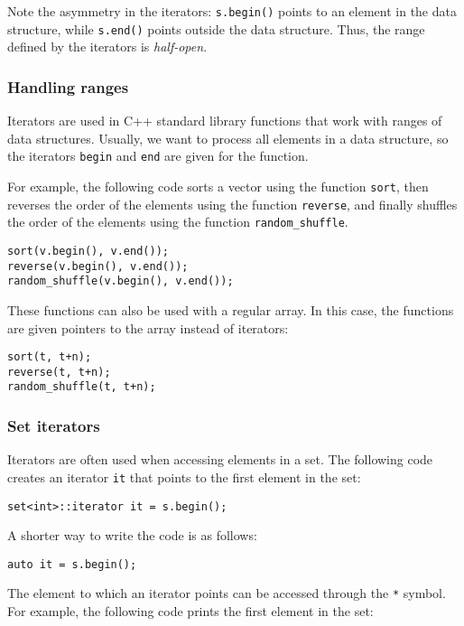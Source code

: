 Note the asymmetry in the iterators:
\texttt{s.begin()} points to an element in the data structure,
while \texttt{s.end()} points outside the data structure.
Thus, the range defined by the iterators is \emph{half-open}.

\subsubsection{Handling ranges}

Iterators are used in C++ standard library functions
that work with ranges of data structures.
Usually, we want to process all elements in a
data structure, so the iterators
\texttt{begin} and \texttt{end} are given for the function.

For example, the following code sorts a vector
using the function \texttt{sort},
then reverses the order of the elements using the function
\texttt{reverse}, and finally shuffles the order of
the elements using the function \texttt{random\_shuffle}.


\begin{lstlisting}
sort(v.begin(), v.end());
reverse(v.begin(), v.end());
random_shuffle(v.begin(), v.end());
\end{lstlisting}

These functions can also be used with a regular array.
In this case, the functions are given pointers to the array
instead of iterators:

\newpage
\begin{lstlisting}
sort(t, t+n);
reverse(t, t+n);
random_shuffle(t, t+n);
\end{lstlisting}

\subsubsection{Set iterators}

Iterators are often used when accessing
elements in a set.
The following code creates an iterator
\texttt{it} that points to the first element in the set:
\begin{lstlisting}
set<int>::iterator it = s.begin();
\end{lstlisting}
A shorter way to write the code is as follows:
\begin{lstlisting}
auto it = s.begin();
\end{lstlisting}
The element to which an iterator points
can be accessed through the \texttt{*} symbol.
For example, the following code prints
the first element in the set:

